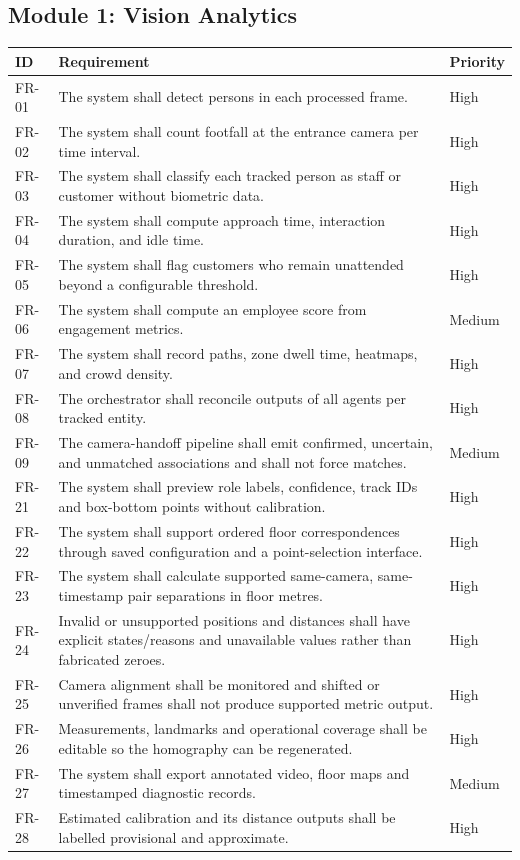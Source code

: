 \subsection{Module 1: Vision Analytics}
\begin{longtable}{P{0.1\textwidth}P{0.62\textwidth}P{0.15\textwidth}}
\toprule
ID & Requirement & Priority\\
\midrule
\endhead
FR-01 & The system shall detect persons in each processed frame. & High\\
FR-02 & The system shall count footfall at the entrance camera per time interval. & High\\
FR-03 & The system shall classify each tracked person as staff or customer without biometric data. & High\\
FR-04 & The system shall compute approach time, interaction duration, and idle time. & High\\
FR-05 & The system shall flag customers who remain unattended beyond a configurable threshold. & High\\
FR-06 & The system shall compute an employee score from engagement metrics. & Medium\\
FR-07 & The system shall record paths, zone dwell time, heatmaps, and crowd density. & High\\
FR-08 & The orchestrator shall reconcile outputs of all agents per tracked entity. & High\\
FR-09 & The camera-handoff pipeline shall emit confirmed, uncertain, and unmatched associations and shall not force matches. & Medium\\
FR-21 & The system shall preview role labels, confidence, track IDs and box-bottom points without calibration. & High\\
FR-22 & The system shall support ordered floor correspondences through saved configuration and a point-selection interface. & High\\
FR-23 & The system shall calculate supported same-camera, same-timestamp pair separations in floor metres. & High\\
FR-24 & Invalid or unsupported positions and distances shall have explicit states/reasons and unavailable values rather than fabricated zeroes. & High\\
FR-25 & Camera alignment shall be monitored and shifted or unverified frames shall not produce supported metric output. & High\\
FR-26 & Measurements, landmarks and operational coverage shall be editable so the homography can be regenerated. & High\\
FR-27 & The system shall export annotated video, floor maps and timestamped diagnostic records. & Medium\\
FR-28 & Estimated calibration and its distance outputs shall be labelled provisional and approximate. & High\\
\bottomrule
\end{longtable}

